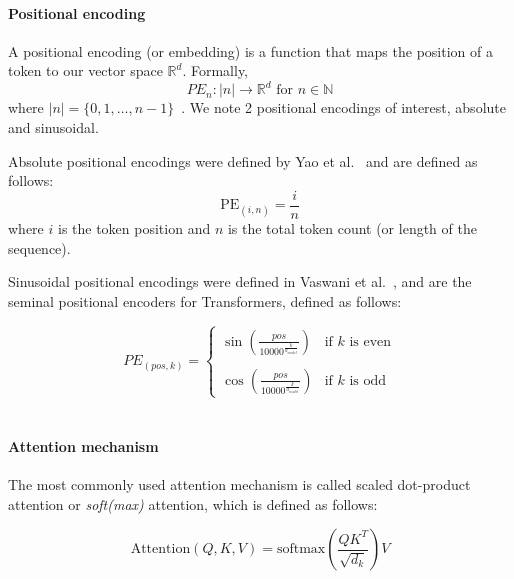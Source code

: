 \paragraph{Positional encoding}
A positional encoding (or embedding) is a function that maps the position of a token to our vector space $\mathbb{R}^d$. Formally,
\begin{equation} \label{eq:pos_enc}
    PE_{n}: |n| \rightarrow \mathbb{R}^d \text{ for } n \in \mathbb{N}
\end{equation}
where $|n| = \{0, 1, \dots, n-1 \}$~\cite{strobl2024formal}. We note 2 positional encodings of interest, absolute and sinusoidal.

Absolute positional encodings were defined by Yao et al.~\cite{bounded-hierarchical-languages} and are defined as follows: 
\begin{equation}\label{eq:abs_pos_enc}
    \text{PE}_{(i,n)} = \frac{i}{n}
\end{equation}
where $i$ is the token position and $n$ is the total token count (or length of the sequence).

Sinusoidal positional encodings were defined in Vaswani et al.~\cite{attention_is_all_you_need}, and are the seminal positional encoders for Transformers, defined as follows:

\begin{equation}\label{eq:sin_pos_enc}
    PE_{(pos, k)} =
    \begin{cases}
        \sin\left(\frac{pos}{10000^{\frac{k}{d_{model}}}}\right) & \text{if } k \text{ is even} \\
        \\
        \cos\left(\frac{pos}{10000^{\frac{k}{d_{model}}}}\right) & \text{if } k \text{ is odd}
    \end{cases}
\end{equation}
\\

\paragraph{Attention mechanism}
The most commonly used attention mechanism is called scaled dot-product attention or \emph{soft(max)} attention, which is defined as follows:

\begin{equation} \label{eq:attn}
    \text{Attention}(Q, K, V) = \text{softmax}\left( \frac{QK^T}{\sqrt{d_k}} \right)V
\end{equation}

